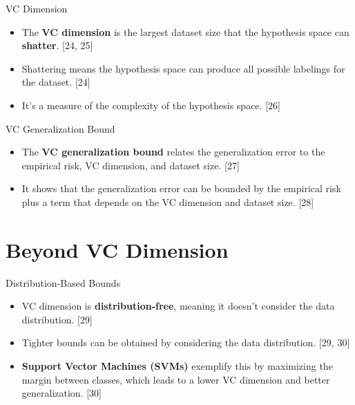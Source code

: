 \documentclass[
  ignorenonframetext,
]{beamer}
\providecommand{\tightlist}{%
  \setlength{\itemsep}{0pt}\setlength{\parskip}{0pt}}\usepackage{longtable,booktabs,array}
\begin{document}
\begin{frame}{VC Dimension}
\label{vc-dimension}
\begin{itemize}
\tightlist
\item
  The \textbf{VC dimension} is the largest dataset size that the
  hypothesis space can \textbf{shatter}. {[}24, 25{]}
\item
  Shattering means the hypothesis space can produce all possible
  labelings for the dataset. {[}24{]}
\item
  It's a measure of the complexity of the hypothesis space. {[}26{]}
\end{itemize}
\end{frame}

\begin{frame}{VC Generalization Bound}
\label{vc-generalization-bound}
\begin{itemize}
\tightlist
\item
  The \textbf{VC generalization bound} relates the generalization error
  to the empirical risk, VC dimension, and dataset size. {[}27{]}
\item
  It shows that the generalization error can be bounded by the empirical
  risk plus a term that depends on the VC dimension and dataset size.
  {[}28{]}
\end{itemize}
\end{frame}

\section{Beyond VC Dimension}\label{beyond-vc-dimension}

\begin{frame}{Distribution-Based Bounds}
\label{distribution-based-bounds}
\begin{itemize}
\tightlist
\item
  VC dimension is \textbf{distribution-free}, meaning it doesn't
  consider the data distribution. {[}29{]}
\item
  Tighter bounds can be obtained by considering the data distribution.
  {[}29, 30{]}
\item
  \textbf{Support Vector Machines (SVMs)} exemplify this by maximizing
  the margin between classes, which leads to a lower VC dimension and
  better generalization. {[}30{]}
\end{itemize}
\end{frame}
\end{document}
